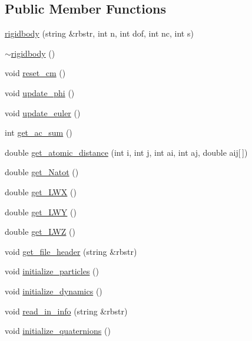 \subsection*{Public Member Functions}
\begin{DoxyCompactItemize}
\item 
\mbox{\hyperlink{classrigidbody_a2d1f12365075606f81a18c3ce9454246}{rigidbody}} (string \&rbstr, int n, int dof, int nc, int s)
\item 
\mbox{\hyperlink{classrigidbody_a70821dc58b283f257e84016962f06381}{$\sim$rigidbody}} ()
\item 
void \mbox{\hyperlink{classrigidbody_a3e81aee584c1f57c729d68000637df37}{reset\+\_\+cm}} ()
\item 
void \mbox{\hyperlink{classrigidbody_af5b3f78c77e8535e2d3f065f66225d3c}{update\+\_\+phi}} ()
\item 
void \mbox{\hyperlink{classrigidbody_a30fc1a6f7cc98cee01b1a0b284c9a461}{update\+\_\+euler}} ()
\item 
int \mbox{\hyperlink{classrigidbody_a9287ef3ed29115edff7a823300b7623d}{get\+\_\+ac\+\_\+sum}} ()
\item 
double \mbox{\hyperlink{classrigidbody_ab60de6c5a1f3595ab4b6c87a2518acf6}{get\+\_\+atomic\+\_\+distance}} (int i, int j, int ai, int aj, double aij\mbox{[}$\,$\mbox{]})
\item 
double \mbox{\hyperlink{classrigidbody_afdbc4769886ebdd81947d3f9cdb5a905}{get\+\_\+\+Natot}} ()
\item 
double \mbox{\hyperlink{classrigidbody_ae697251dbe67f538682959ccc7aacec0}{get\+\_\+\+L\+WX}} ()
\item 
double \mbox{\hyperlink{classrigidbody_a922325c42744a3e26fafe69e34c884ab}{get\+\_\+\+L\+WY}} ()
\item 
double \mbox{\hyperlink{classrigidbody_aa97f66b8147830cf83b2298ab8c2b286}{get\+\_\+\+L\+WZ}} ()
\item 
void \mbox{\hyperlink{classrigidbody_a0f3f1cbb05a92009e5831e657ee608cc}{get\+\_\+file\+\_\+header}} (string \&rbstr)
\item 
void \mbox{\hyperlink{classrigidbody_a948adf54e71037640543643bbfd1a7c5}{initialize\+\_\+particles}} ()
\item 
void \mbox{\hyperlink{classrigidbody_a41b996f7b9d8064b3c14a2613293873c}{initialize\+\_\+dynamics}} ()
\item 
void \mbox{\hyperlink{classrigidbody_a84c05d9190b4cab031ca9ab7cd18cd9e}{read\+\_\+in\+\_\+info}} (string \&rbstr)
\item 
void \mbox{\hyperlink{classrigidbody_ae4020098663edf7350e3f7061dacb82a}{initialize\+\_\+quaternions}} ()

\end{DoxyCompactItemize}
